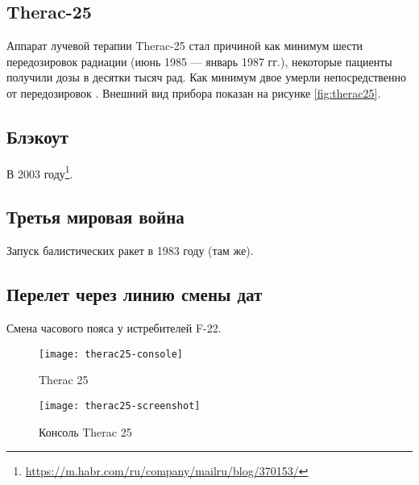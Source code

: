 \subsection{Therac-25}

    Аппарат лучевой терапии Therac-25 стал причиной как минимум шести передозировок радиации (июнь 1985 --- январь 1987 гг.),
    некоторые пациенты получили дозы в десятки тысяч рад. Как минимум двое умерли непосредственно от передозировок \cite{journal:computer:1993:therac25}.
    Внешний вид прибора показан на рисунке \ref{fig:therac25}.
\subsection{Блэкоут}
    В 2003 году\footnote{\url{https://m.habr.com/ru/company/mailru/blog/370153/}}.
\subsection{Третья мировая война} %
    Запуск балистических ракет в 1983 году (там же).
    \subsection{Перелет через линию смены дат}
    Смена часового пояса у истребителей F-22. 

\begin{center}
\begin{figure}[hb]
    \texttt{[image: therac25-console]}
    \caption{Therac 25}\label{fig:therac25}
    \texttt{[image: therac25-screenshot]}
    \caption{Консоль Therac 25}\label{fig:therac25_console}
\end{figure}
\end{center}
